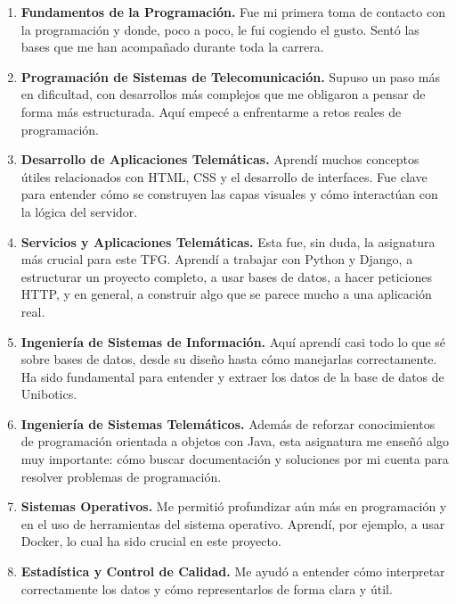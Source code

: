 \documentclass[a4paper, 12pt]{book}
\begin{document}
\begin{enumerate}
  
    \item \textbf{Fundamentos de la Programación.} Fue mi primera toma de contacto con la programación y donde, poco a poco, le fui cogiendo el gusto. Sentó las bases que me han acompañado durante toda la carrera.

    \item \textbf{Programación de Sistemas de Telecomunicación.} Supuso un paso más en dificultad, con desarrollos más complejos que me obligaron a pensar de forma más estructurada. Aquí empecé a enfrentarme a retos reales de programación.

    \item \textbf{Desarrollo de Aplicaciones Telemáticas.} Aprendí muchos conceptos útiles relacionados con HTML, CSS y el desarrollo de interfaces. Fue clave para entender cómo se construyen las capas visuales y cómo interactúan con la lógica del servidor.

    \item \textbf{Servicios y Aplicaciones Telemáticas.} Esta fue, sin duda, la asignatura más crucial para este TFG. Aprendí a trabajar con Python y Django, a estructurar un proyecto completo, a usar bases de datos, a hacer peticiones HTTP, y en general, a construir algo que se parece mucho a una aplicación real. 

    \item \textbf{Ingeniería de Sistemas de Información.} Aquí aprendí casi todo lo que sé sobre bases de datos, desde su diseño hasta cómo manejarlas correctamente. Ha sido fundamental para entender y extraer los datos de la base de datos de Unibotics.

    \item \textbf{Ingeniería de Sistemas Telemáticos.} Además de reforzar conocimientos de programación orientada a objetos con Java, esta asignatura me enseñó algo muy importante: cómo buscar documentación y soluciones por mi cuenta para resolver problemas de programación.

    \item \textbf{Sistemas Operativos.} Me permitió profundizar aún más en programación y en el uso de herramientas del sistema operativo. Aprendí, por ejemplo, a usar Docker, lo cual ha sido crucial en este proyecto.

    \item \textbf{Estadística y Control de Calidad.} Me ayudó a entender cómo interpretar correctamente los datos y cómo representarlos de forma clara y útil.

\end{enumerate}
\end{document}
